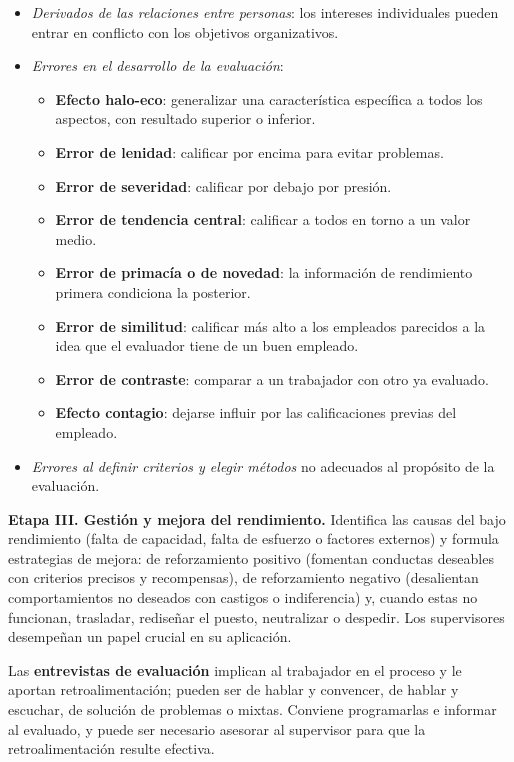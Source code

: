 \documentclass[12pt]{book} %
\providecommand{\tightlist}{%
  \setlength{\itemsep}{0pt}\setlength{\parskip}{0pt}}
\begin{document}
\begin{itemize}
\tightlist
\item
  \emph{Derivados de las relaciones entre personas}: los intereses
  individuales pueden entrar en conflicto con los objetivos
  organizativos.
\item
  \emph{Errores en el desarrollo de la evaluación}:

  \begin{itemize}
  \tightlist
  \item
    \textbf{Efecto halo-eco}: generalizar una característica específica
    a todos los aspectos, con resultado superior o inferior.
  \item
    \textbf{Error de lenidad}: calificar por encima para evitar
    problemas.
  \item
    \textbf{Error de severidad}: calificar por debajo por presión.
  \item
    \textbf{Error de tendencia central}: calificar a todos en torno a un
    valor medio.
  \item
    \textbf{Error de primacía o de novedad}: la información de
    rendimiento primera condiciona la posterior.
  \item
    \textbf{Error de similitud}: calificar más alto a los empleados
    parecidos a la idea que el evaluador tiene de un buen empleado.
  \item
    \textbf{Error de contraste}: comparar a un trabajador con otro ya
    evaluado.
  \item
    \textbf{Efecto contagio}: dejarse influir por las calificaciones
    previas del empleado.
  \end{itemize}
\item
  \emph{Errores al definir criterios y elegir métodos} no adecuados al
  propósito de la evaluación.
\end{itemize}

\textbf{Etapa III. Gestión y mejora del rendimiento.} Identifica las
causas del bajo rendimiento (falta de capacidad, falta de esfuerzo o
factores externos) y formula estrategias de mejora: de reforzamiento
positivo (fomentan conductas deseables con criterios precisos y
recompensas), de reforzamiento negativo (desalientan comportamientos no
deseados con castigos o indiferencia) y, cuando estas no funcionan,
trasladar, rediseñar el puesto, neutralizar o despedir. Los supervisores
desempeñan un papel crucial en su aplicación.

Las \textbf{entrevistas de evaluación} implican al trabajador en el
proceso y le aportan retroalimentación; pueden ser de hablar y
convencer, de hablar y escuchar, de solución de problemas o mixtas.
Conviene programarlas e informar al evaluado, y puede ser necesario
asesorar al supervisor para que la retroalimentación resulte efectiva.
\end{document}

